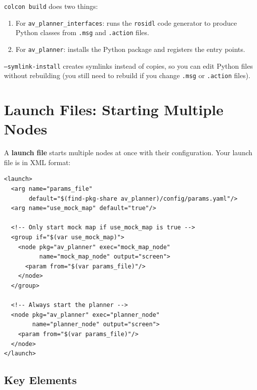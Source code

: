 \documentclass[12pt, a4paper]{article}
\begin{document}
\texttt{colcon build} does two things:
\begin{enumerate}[nosep]
    \item For \texttt{av\_planner\_interfaces}: runs the \texttt{rosidl}
          code generator to produce Python classes from \texttt{.msg}
          and \texttt{.action} files.
    \item For \texttt{av\_planner}: installs the Python package and
          registers the entry points.
\end{enumerate}

\texttt{--symlink-install} creates symlinks instead of copies, so you
can edit Python files without rebuilding (you still need to rebuild
if you change \texttt{.msg} or \texttt{.action} files).


\section{Launch Files: Starting Multiple Nodes}
\label{sec:launch}

A \textbf{launch file} starts multiple nodes at once with their
configuration. Your launch file is in XML format:

\begin{lstlisting}[style=xml, caption={launch/planner.launch.xml}]
<launch>
  <arg name="params_file"
       default="$(find-pkg-share av_planner)/config/params.yaml"/>
  <arg name="use_mock_map" default="true"/>

  <!-- Only start mock map if use_mock_map is true -->
  <group if="$(var use_mock_map)">
    <node pkg="av_planner" exec="mock_map_node"
          name="mock_map_node" output="screen">
      <param from="$(var params_file)"/>
    </node>
  </group>

  <!-- Always start the planner -->
  <node pkg="av_planner" exec="planner_node"
        name="planner_node" output="screen">
    <param from="$(var params_file)"/>
  </node>
</launch>
\end{lstlisting}

\subsection{Key Elements}
\end{document}
